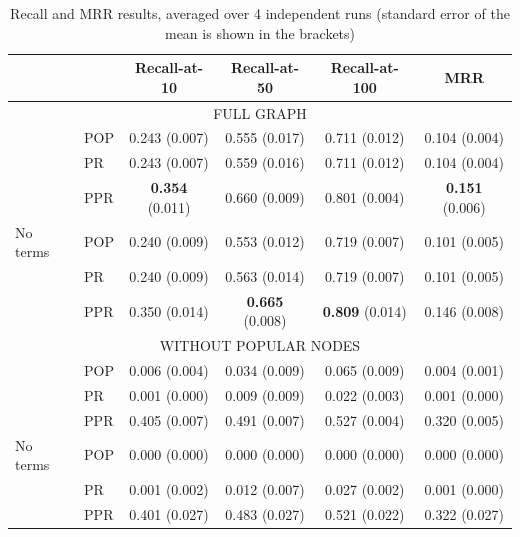 \documentclass[ijoc,nonblindrev]{informs3} %
\numberwithin{equation}{subsection}
\begin{document}
\begin{table}[!htbp]
\small
\centering
\caption{Recall and MRR results, averaged over 4 independent runs (standard error of the mean is shown in the brackets)}
\label{tab:full}
\begin{tabular}{llcccc} \hline
	& & Recall-at-10 & Recall-at-50 & Recall-at-100 & MRR	 \\
\hline
\multicolumn{6}{c}{FULL GRAPH} \\
\hline
& POP & 0.243 (0.007) & 0.555 (0.017) & 0.711 (0.012) & 0.104 (0.004) \\
& PR & 	0.243 (0.007) & 0.559 (0.016) & 0.711 (0.012) & 0.104 (0.004) \\
& PPR	& \textbf{0.354}	(0.011) & 0.660	(0.009) & 0.801 (0.004) & \textbf{0.151}	(0.006) \\
\hline
No terms & POP & 0.240 (0.009) & 0.553 (0.012) & 0.719 (0.007) & 0.101 (0.005) \\
& PR & 0.240 (0.009) & 0.563 (0.014) & 0.719 (0.007) & 0.101 (0.005) \\
& PPR	& 0.350	(0.014) & \textbf{0.665}	(0.008) & \textbf{0.809}	(0.014) & 0.146	(0.008) \\
\hline
\hline
\multicolumn{6}{c}{WITHOUT POPULAR NODES} \\
\hline
 & POP & 	0.006 (0.004) & 0.034 (0.009) & 0.065 (0.009) & 0.004 (0.001) \\
 & PR	& 0.001	(0.000) & 0.009	(0.009) & 0.022	(0.003) & 0.001	(0.000) \\
& PPR	& 0.405	(0.007) & 0.491 (0.007) & 0.527	(0.004) & 0.320	(0.005) \\
\hline
No terms & POP & 	0.000 (0.000) & 0.000 (0.000) & 0.000 (0.000) & 0.000 (0.000) \\
& PR & 	0.001 (0.002) & 0.012 (0.007) & 0.027 (0.002) & 0.001 (0.000) \\
& PPR & 	0.401 (0.027) & 0.483 (0.027) & 0.521 (0.022) & 0.322 (0.027) \\
\hline
\hline
\end{tabular}
\end{table}
\end{document}
